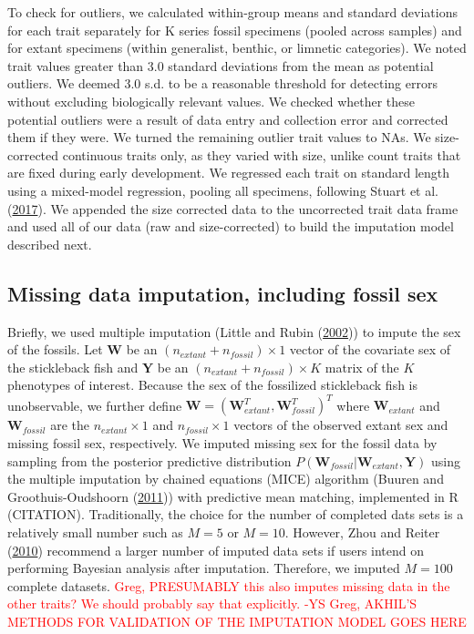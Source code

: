 \documentclass[
  12pt,
]{article}
\begin{document}
To check for outliers, we calculated within-group means and standard
deviations for each trait separately for K series fossil specimens
(pooled across samples) and for extant specimens (within generalist,
benthic, or limnetic categories). We noted trait values greater than 3.0
standard deviations from the mean as potential outliers. We deemed 3.0
s.d. to be a reasonable threshold for detecting errors without excluding
biologically relevant values. We checked whether these potential
outliers were a result of data entry and collection error and corrected
them if they were. We turned the remaining outlier trait values to NAs.
We size-corrected continuous traits only, as they varied with size,
unlike count traits that are fixed during early development. We
regressed each trait on standard length using a mixed-model regression,
pooling all specimens, following Stuart et al.
(\protect\hyperlink{ref-Stuartetal2017}{2017}). We appended the size
corrected data to the uncorrected trait data frame and used all of our
data (raw and size-corrected) to build the imputation model described
next.

\hypertarget{missing-data-imputation-including-fossil-sex}{%
\subsection{Missing data imputation, including fossil
sex}\label{missing-data-imputation-including-fossil-sex}}

Briefly, we used multiple imputation (Little and Rubin
(\protect\hyperlink{ref-little2002statistical}{2002})) to impute the sex
of the fossils. Let \(\boldsymbol{W}\) be an
\((n_{extant} + n_{fossil}) \times 1\) vector of the covariate sex of
the stickleback fish and \(\boldsymbol{Y}\) be an
\((n_{extant} + n_{fossil}) \times K\) matrix of the \(K\) phenotypes of
interest. Because the sex of the fossilized stickleback fish is
unobservable, we further define
\(\boldsymbol{W} = (\boldsymbol{W}_{extant}^T,\boldsymbol{W}_{fossil}^T)^T\)
where \(\boldsymbol{W}_{extant}\) and \(\boldsymbol{W}_{fossil}\) are
the \(n_{extant} \times 1\) and \(n_{fossil} \times 1\) vectors of the
observed extant sex and missing fossil sex, respectively. We imputed
missing sex for the fossil data by sampling from the posterior
predictive distribution
\(P(\boldsymbol{W}_{fossil}|\boldsymbol{W}_{extant},\boldsymbol{Y})\)
using the multiple imputation by chained equations (MICE) algorithm
(Buuren and Groothuis-Oudshoorn (\protect\hyperlink{ref-MICE}{2011}))
with predictive mean matching, implemented in R (CITATION).
Traditionally, the choice for the number of completed dats sets is a
relatively small number such as \(M = 5\) or \(M = 10\). However, Zhou
and Reiter (\protect\hyperlink{ref-ZhouReiter2010}{2010}) recommend a
larger number of imputed data sets if users intend on performing
Bayesian analysis after imputation. Therefore, we imputed \(M = 100\)
complete datasets.
\textcolor{red}{Greg, PRESUMABLY this also imputes missing data in the other traits? We should probably say that explicitly. -YS}
\textcolor{red}{Greg, AKHIL'S METHODS FOR VALIDATION OF THE IMPUTATION MODEL GOES HERE}
\end{document}
